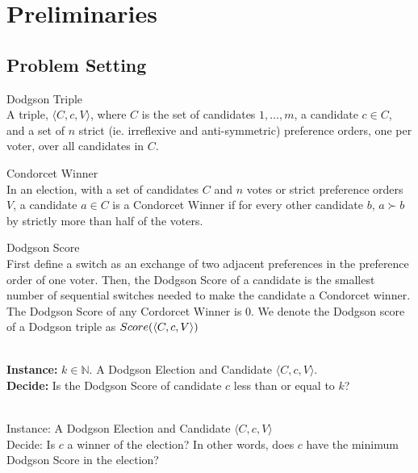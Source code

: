 \section{Preliminaries}

\subsection{Problem Setting}

\begin{defn}{Dodgson Triple}\\
    A triple, $\langle C, c, V \rangle$, where $C$ is the set of candidates
    $1, \dots , m$, a candidate $c \in C$, and a set of $n$ strict
    (ie. irreflexive and anti-symmetric) preference orders,
    one per voter, over all candidates in $C$.
\end{defn}



\begin{defn}{Condorcet Winner}\\
    In an election, with a set of candidates $C$ and $n$ votes or strict preference
    orders $V$, a candidate $a \in C$ is a Condorcet Winner if for every other
    candidate $b$, $a \succ b$ by strictly more than half of the voters.

\end{defn}

\begin{defn}{Dodgson Score}\label{def:dscore}\\
    First define a switch as an exchange of two adjacent preferences in the
    preference order of one voter.
    Then, the Dodgson Score of a candidate is the smallest number of sequential
    switches needed to make the candidate a
    Condorcet winner.
    The Dodgson Score of any Cordorcet Winner is 0.
    We denote the Dodgson score of a Dodgson triple as $Score(\langle C,c,V \rangle)$
\end{defn}

\begin{problem}{} \\
    \tab \textbf{Instance:} $k \in \mathbb{N}$.
        A Dodgson Election and Candidate $\langle C,c,V \rangle$. \\
    \tab \textbf{Decide:} Is the Dodgson Score of candidate $c$ less than or
        equal to $k$?
\end{problem}

\begin{problem}{} \\
    \tab Instance: A Dodgson Election and Candidate $\langle C,c,V \rangle$ \\
    \tab Decide: Is $c$ a winner of the election?
    In other words, does $c$ have the minimum Dodgson Score in the election?

\end{problem}

